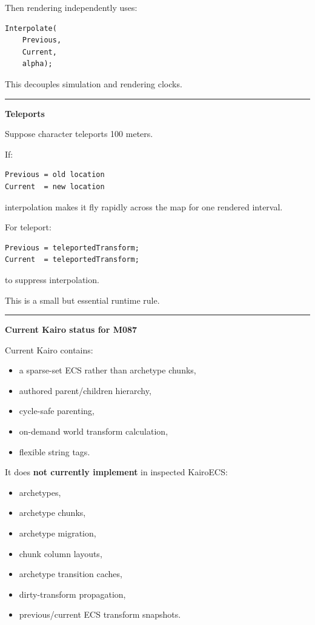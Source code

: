 Then rendering independently uses:

\begin{verbatim}
Interpolate(
    Previous,
    Current,
    alpha);
\end{verbatim}

This decouples simulation and rendering clocks.

\begin{center}\rule{0.5\linewidth}{0.5pt}\end{center}

\textbf{Teleports}

Suppose character teleports 100 meters.

If:

\begin{verbatim}
Previous = old location
Current  = new location
\end{verbatim}

interpolation makes it fly rapidly across the map for one rendered interval.

For teleport:

\begin{verbatim}
Previous = teleportedTransform;
Current  = teleportedTransform;
\end{verbatim}

to suppress interpolation.

This is a small but essential runtime rule.

\begin{center}\rule{0.5\linewidth}{0.5pt}\end{center}

\textbf{Current Kairo status for M087}

Current Kairo contains:

\begin{itemize}
\tightlist
\item
  a sparse-set ECS rather than archetype chunks,
\item
  authored  parent/children hierarchy,
\item
  cycle-safe parenting,
\item
  on-demand world transform calculation,
\item
  flexible string tags.
\end{itemize}

It does \textbf{not currently implement} in inspected KairoECS:

\begin{itemize}
\tightlist
\item
  archetypes,
\item
  archetype chunks,
\item
  archetype migration,
\item
  chunk column layouts,
\item
  archetype transition caches,
\item
  dirty-transform propagation,
\item
  previous/current ECS transform snapshots.
\end{itemize}

